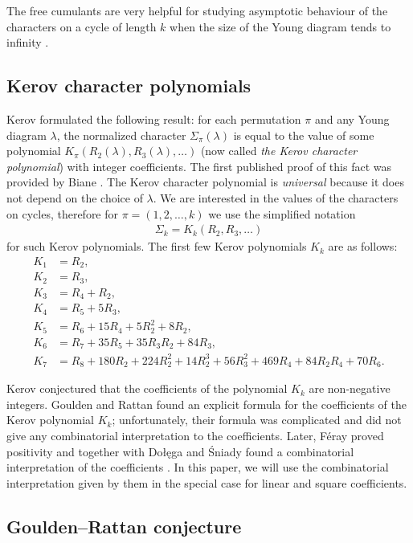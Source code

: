\documentclass[submission]{FPSAC2021}
\begin{document}
The free cumulants are very helpful for studying
asymptotic behaviour of the characters on a cycle 
of length $k$ when the size of the Young diagram 
tends to infinity \cite{Bia98}.

\subsection{Kerov character polynomials}

Kerov formulated the following result: 
for each permutation $\pi$ and any Young
diagram $\lambda$, the normalized 
character $\Sigma_{\pi}(\lambda)$ is 
equal to the value of some polynomial 
$K_{\pi}(R_2(\lambda), R_3(\lambda), \ldots)$
(now called \emph{the Kerov character polynomial})
with integer coefficients. The first 
published proof of this fact was provided 
by Biane \cite{Bia03}. The Kerov character
polynomial is \emph{universal} because it 
does not depend on the choice of $\lambda$. 
We are interested in the values of the 
characters on cycles, therefore for 
$\pi=(1, 2, \ldots, k)$ we use 
the simplified notation
\begin{align}
\label{kerpol}
\Sigma_k=K_k(R_2, R_3, \ldots)
\end{align}
for such Kerov polynomials. The first few Kerov polynomials $K_k$ are as follows:
\begin{align*}
K_1&=R_2,\\
K_2&=R_3,\\
K_3&=R_4+R_2,\\
K_4&=R_5+5R_3,\\
K_5&=R_6+15R_4+5R_2^2+8R_2,\\
K_6&=R_7+35R_5+35R_3R_2+84R_3, \\
K_7&=R_8+180R_2+224R_2^2+14R_2^3+56R_3^2+469R_4+84R_2R_4+70R_6.
\end{align*}

Kerov conjectured that the coefficients of 
the polynomial $K_k$ are non-negative integers.
Goulden and Rattan \cite{GR05} found an explicit 
formula for the coefficients of the Kerov
polynomial $K_k$; unfortunately, their formula 
was complicated and did not give any combinatorial
interpretation to the coefficients. Later, 
F\'{e}ray proved positivity \cite{Fer09} and together 
with Dołęga and Śniady found a combinatorial 
interpretation of the coefficients \cite{DFS10}.
In this paper, we will use the combinatorial
interpretation given by them in the special case 
for linear and square coefficients.


\subsection{Goulden--Rattan conjecture}
\end{document}
